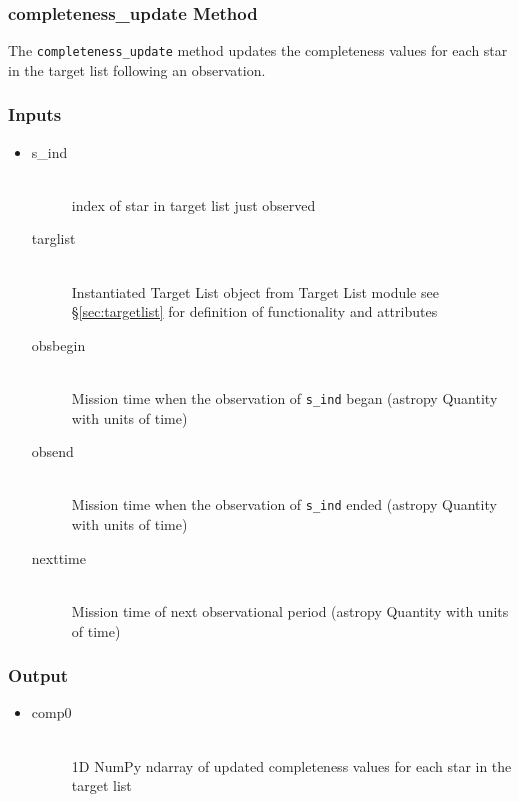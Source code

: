 \documentclass[cleanfoot]{asme2ej}
\begin{document}
\subsubsection{completeness\_update Method}
\label{sec:completenessupdatetask}
The \verb+completeness_update+ method updates the completeness values for each star in the target list following an observation.

\subsubsection*{Inputs}
\begin{itemize}
    \item 
    \begin{description}
        \item[s\_ind] \hfill \\
        index of star in target list just observed
        \item[targlist] \hfill \\
        Instantiated Target List object from Target List module see \S\ref{sec:targetlist} for definition of functionality and attributes
        \item[obsbegin] \hfill \\
        Mission time when the observation of \verb+s_ind+ began (astropy Quantity with units of time)
        \item[obsend] \hfill \\
        Mission time when the observation of \verb+s_ind+ ended (astropy Quantity with units of time)
        \item[nexttime] \hfill \\
        Mission time of next observational period (astropy Quantity with units of time)
    \end{description}
\end{itemize}

\subsubsection*{Output}
\begin{itemize}
    \item 
    \begin{description}
        \item[comp0] \hfill \\
        1D NumPy ndarray of updated completeness values for each star in the target list
    \end{description}
\end{itemize}
\end{document}
